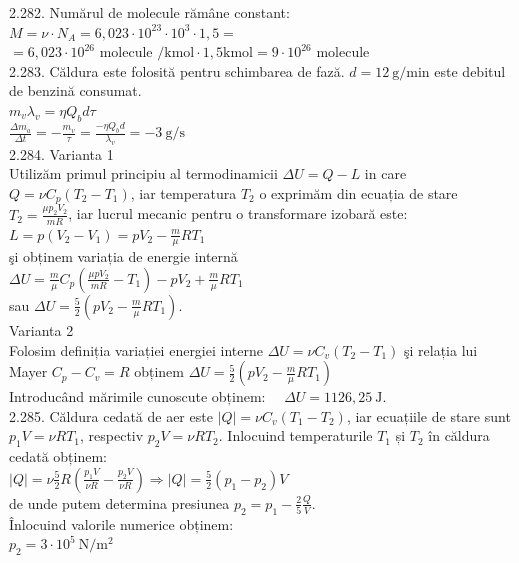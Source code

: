 2.282. Numărul de molecule rămâne constant:\\ $M=\nu \cdot N_{A}=6,023 \cdot 10^{23} \cdot 10^{3} \cdot 1,5=$\\ $=6,023 \cdot 10^{26} \text { molecule } / \mathrm{kmol} \cdot 1,5 \mathrm{kmol}=9 \cdot 10^{26}$ molecule\\

2.283. Căldura este folosită pentru schimbarea de fază. $d=12 \mathrm{~g} / \mathrm{min}$ este debitul de benzină consumat.\\ $m_{v} \lambda_{v}=\eta Q_{b} d \tau$\\ $\frac{\Delta m_{a}}{\Delta t}=-\frac{m_{v}}{\tau}=\frac{-\eta Q_{b} d}{\lambda_{v}}=-3 \mathrm{~g} / \mathrm{s}$\\

2.284. Varianta 1\\ Utilizăm primul principiu al termodinamicii $\Delta U=Q-L$ in care $Q=\nu C_{p}\left(T_{2}-T_{1}\right)$, iar temperatura $T_{2}$ o exprimăm din ecuația de stare $T_{2}=\frac{\mu p_{2} V_{2}}{m R}$, iar lucrul mecanic pentru o transformare izobară este:\\ $L=p\left(V_{2}-V_{1}\right)=p V_{2}-\frac{m}{\mu} R T_{1}$\\ şi obținem variația de energie internă\\ $\Delta U=\frac{m}{\mu} C_{p}\left(\frac{\mu p V_{2}}{m R}-T_{1}\right)-p V_{2}+\frac{m}{\mu} R T_{1}$\\ sau $\Delta U=\frac{5}{2}\left(p V_{2}-\frac{m}{\mu} R T_{1}\right)$.\\ Varianta 2\\ Folosim definiția variației energiei interne $\Delta U=\nu C_{v}\left(T_{2}-T_{1}\right)$ şi relația lui Mayer $C_{p}-C_{v}=R$ obținem $\Delta U=\frac{5}{2}\left(p V_{2}-\frac{m}{\mu} R T_{1}\right)$\\ Introducând mărimile cunoscute obținem: $\quad \Delta U=1126,25 \mathrm{~J}$.\\ 

2.285. Căldura cedată de aer este $|Q|=\nu C_{v}\left(T_{1}-T_{2}\right)$, iar ecuațiile de stare sunt $p_{1} V=\nu R T_{1}$, respectiv $p_{2} V=\nu R T_{2}$. Inlocuind temperaturile $T_{1}$ și $T_{2}$ în căldura cedată obținem:\\ $|Q|=\nu \frac{5}{2} R\left(\frac{p_{1} V}{\nu R}-\frac{p_{2} V}{\nu R}\right) \Rightarrow|Q|=\frac{5}{2}\left(p_{1}-p_{2}\right) V$\\ de unde putem determina presiunea $p_{2}=p_{1}-\frac{2}{5} \frac{Q}{V}$.\\ Înlocuind valorile numerice obținem:\\ $p_{2}=3 \cdot 10^{5} \mathrm{~N} / \mathrm{m}^{2}$\\

